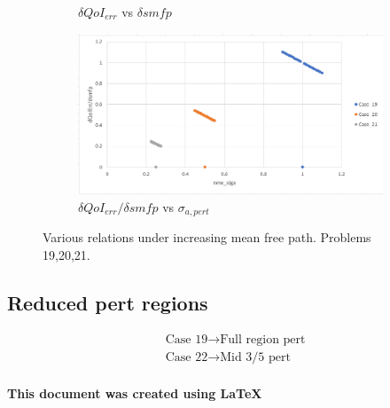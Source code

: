 \documentclass{article}
\begin{document}
\begin{figure}[H]
\begin{subfigure}{.49\textwidth}
  \caption{$\delta QoI_{err}$ vs $\delta smfp$}
  \label{fig:sub3}
\end{subfigure}
\begin{subfigure}{.49\textwidth}
  \centering
  \includegraphics[width=1\linewidth]{dQOIdivMfpVsSiga4.png}
  \caption{$\delta QoI_{err}/\delta smfp$ vs $\sigma_{a,pert}$}
  \label{fig:sub4}
\end{subfigure}
\caption{Various relations under increasing mean free path. Problems 19,20,21.}
\label{fig:Comp1}
\end{figure}

\subsection{Reduced pert regions}
\begin{align*}
&\text{Case 19} \to \text{Full region pert} \\
&\text{Case 22} \to \text{Mid 3/5 pert} \\
\end{align*}


\newpage

\textbf{This document was created using \LaTeX}
\end{document}
